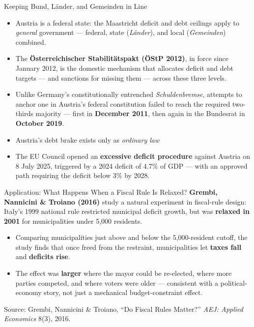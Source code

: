 \documentclass[11pt,aspectratio=169]{beamer}
\newcommand{\srcnote}[1]{{\footnotesize\color{wugray}Source: #1}}
\begin{document}
\begin{frame}{Keeping Bund, Länder, and Gemeinden in Line}
  \small
  \begin{itemize}
    \item Austria is a federal state: the Maastricht deficit and debt ceilings apply to \emph{general} government --- federal, state (\emph{Länder}), and local (\emph{Gemeinden})  combined.
    \item The \textbf{Österreichischer Stabilitätspakt (ÖStP 2012)}, in force since January 2012, is the domestic mechanism that allocates deficit and debt targets --- and sanctions for missing them --- across these three levels.
   \item  Unlike Germany's constitutionally entrenched \emph{Schuldenbremse}, attempts to anchor one in Austria's federal constitution failed to reach the required two-thirds majority --- first in \textbf{December 2011}, then again in the Bundesrat in \textbf{October 2019}. 
   \item Austria's debt brake exists only as \emph{ordinary law}  
   \item The EU Council opened an \textbf{excessive deficit procedure} against Austria on 8 July 2025, triggered by a 2024 deficit of 4.7\% of GDP --- with an approved path requiring the deficit below 3\% by 2028.
  \end{itemize}
 
\end{frame}

 

\begin{frame}{Application: What Happens When a Fiscal Rule Is Relaxed?}
  \small
  \textbf{Grembi, Nannicini \& Troiano (2016)} study a natural experiment in fiscal-rule design: Italy's 1999 national rule restricted municipal deficit growth, but was \textbf{relaxed in 2001} for municipalities under 5{,}000 residents.
  \vspace{0.4em}
  \begin{itemize}
    \item Comparing municipalities just above and below the 5{,}000-resident cutoff, the study finds that once freed from the restraint, municipalities let \textbf{taxes fall} and \textbf{deficits rise}.
    \item The effect was \textbf{larger} where the mayor could be re-elected, where more parties competed, and where voters were older --- consistent with a political-economy story, not just a mechanical budget-constraint effect.
  \end{itemize}
 

  
  \srcnote{Grembi, Nannicini \& Troiano, ``Do Fiscal Rules Matter?'' \emph{AEJ: Applied Economics} 8(3), 2016.}
\end{frame}
\end{document}
